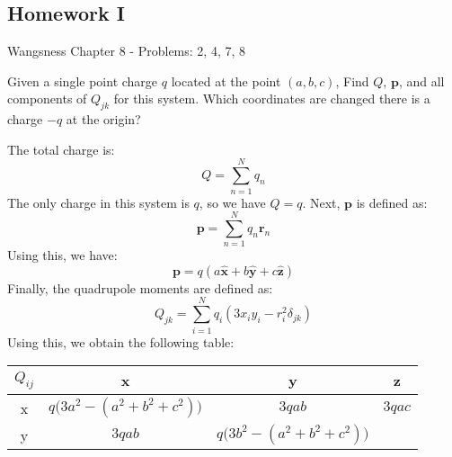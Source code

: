 \documentclass[crop=false,class=book,oneside]{standalone}
\begin{document}
        \subsection{Homework I}
            Wangsness Chapter 8 - Problems: 2, 4, 7, 8
            \begin{problem}
                \label{problem:EMAG_II_Wangsnes_8_2}
                Given a single point charge $q$ located at the
                point $(a,b,c)$, Find $Q$, $\mathbf{p}$, and
                all components of $Q_{jk}$ for this system. Which
                coordinates are changed there is a charge $\minus{q}$
                at the origin?
            \end{problem}
            \begin{solution}
                The total charge is:
                \begin{equation}
                    Q=\sum_{n=1}^{N}q_{n}
                \end{equation}
                The only charge in this system is $q$, so we have
                $Q=q$. Next, $\mathbf{p}$ is defined as:
                \begin{equation}
                    \mathbf{p}=
                    \sum_{n=1}^{N}q_{n}\mathbf{r}_{n}
                \end{equation}
                Using this, we have:
                \begin{equation}
                    \mathbf{p}=
                    q(a\hat{\mathbf{x}}+b\hat{\mathbf{y}}+c\hat{\mathbf{z}})
                \end{equation}
                Finally, the quadrupole moments are defined as:
                \begin{equation}
                    Q_{jk}=
                    \sum_{i=1}^{N}q_{i}(3x_{i}y_{i}-r^{2}_{i}\delta_{jk})
                \end{equation}
                Using this, we obtain the following table:
                \begin{table}[H]
                    \centering
                    \captionsetup{type=table}
                    \begin{tabular}{|c|c|c|c|}
                        \hline
                        $Q_{ij}$&x&y&z\\
                        \hline
                        x&$q\big(3a^{2}-(a^{2}+b^{2}+c^{2})\big)$&
                        $3qab$&$3qac$\\
                        \hline
                        y&$3qab$&$q\big(3b^{2}-(a^{2}+b^{2}+c^{2})\big)$

\end{tabular}
\end{table}
\end{solution}
\end{document}
